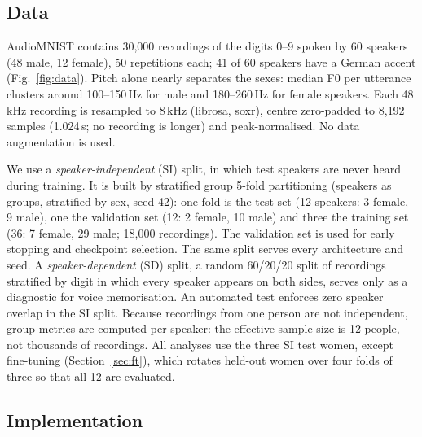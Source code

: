 \documentclass[conference]{IEEEtran}
\begin{document}
\subsection{Data}
AudioMNIST \cite{becker2024audiomnist} contains 30{,}000 recordings of the
digits 0--9 spoken by 60 speakers (48 male, 12 female), 50 repetitions each;
41 of 60 speakers have a German accent (Fig.~\ref{fig:data}). Pitch alone
nearly separates the sexes: median F0 per utterance clusters around
100--150\,Hz for male and 180--260\,Hz for female speakers. Each 48\,kHz
recording is resampled to 8\,kHz (librosa, soxr), centre zero-padded to 8{,}192
samples (1.024\,s; no recording is longer) and peak-normalised. No data
augmentation is used.

We use a \emph{speaker-independent} (SI) split, in which test speakers are
never heard during training. It is built by stratified group 5-fold
partitioning (speakers as groups, stratified by sex, seed 42): one fold is
the test set (12 speakers: 3 female, 9 male), one the validation set (12: 2
female, 10 male) and three the training set (36: 7 female, 29 male; 18{,}000
recordings). The validation set is used for early stopping and checkpoint
selection. The same split serves every architecture and seed. A
\emph{speaker-dependent} (SD) split, a random 60/20/20 split of recordings
stratified by digit in which every speaker appears on both sides, serves only
as a diagnostic for voice memorisation. An automated test enforces zero
speaker overlap in the SI split. Because recordings from one person are not
independent, group metrics are computed per speaker: the effective sample
size is 12 people, not thousands of recordings. All analyses use the three
SI test women, except fine-tuning (Section~\ref{sec:ft}), which rotates
held-out women over four folds of three so that all 12 are evaluated.

\subsection{Implementation}
\end{document}
